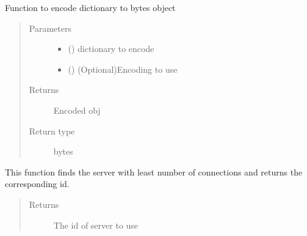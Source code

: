 \documentclass[letterpaper,10pt,english]{sphinxmanual}
\begin{document}
\begin{fulllineitems}
\begin{quote}
\begin{description}
\end{description}\end{quote}

\begin{fulllineitems}
\label{\detokenize{lb_msg:lb_msg.LoadBalancerMessage._json_encode}}
Function to encode dictionary to bytes object
\begin{quote}\begin{description}
\item[{Parameters}] \leavevmode\begin{itemize}
\item {} 
 () \textendash{} dictionary to encode

\item {} 
 () \textendash{} (Optional)Encoding to use

\end{itemize}

\item[{Returns}] \leavevmode
Encoded obj

\item[{Return type}] \leavevmode
bytes

\end{description}\end{quote}

\end{fulllineitems}


\begin{fulllineitems}
\label{\detokenize{lb_msg:lb_msg.LoadBalancerMessage._getAvailableServerID}}
This function finds the server with least number of connections and returns the corresponding id.
\begin{quote}\begin{description}
\item[{Returns}] \leavevmode
The id of server to use


\end{description}
\end{quote}
\end{fulllineitems}
\end{fulllineitems}
\end{document}
